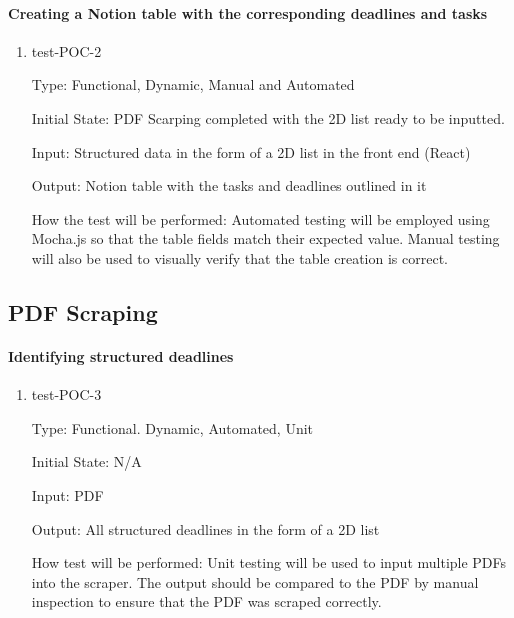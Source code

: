 \documentclass[12pt, titlepage]{article}
\begin{document}
\paragraph{Creating a Notion table with the corresponding deadlines and tasks}

\begin{enumerate}

\item{test-POC-2\\}

Type: Functional, Dynamic, Manual and Automated

Initial State: PDF Scarping completed with the 2D list ready to be inputted. 

Input: Structured data in the form of a 2D list in the front end (React) 

Output: Notion table with the tasks and deadlines outlined in it 

How the test will be performed: Automated testing will be employed using Mocha.js so that the table fields match their expected value. Manual testing will also be used to visually verify that the table creation is correct. 

\end{enumerate}

\subsection{PDF Scraping}

\paragraph{Identifying structured deadlines}

\begin{enumerate}

\item{test-POC-3\\}

Type: Functional. Dynamic, Automated, Unit

Initial State: N/A

Input: PDF 

Output: All structured deadlines in the form of a 2D list

How test will be performed: Unit testing will be used to input multiple PDFs into the scraper. The output should be compared to the PDF by manual inspection to ensure that the PDF was scraped correctly. 

\end{enumerate}
\end{document}

